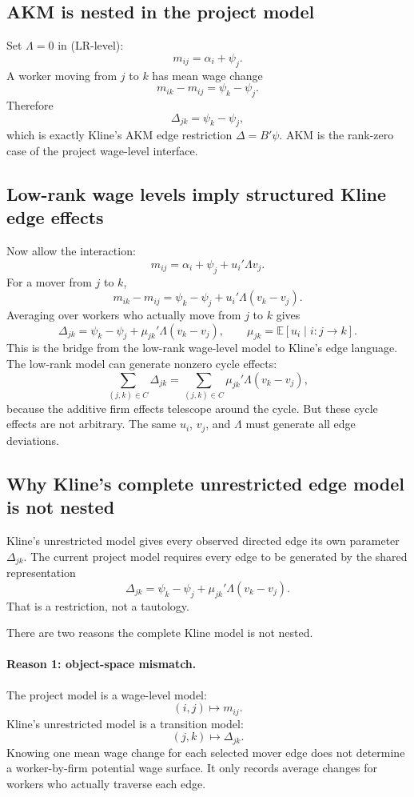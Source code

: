 \documentclass[11pt]{article}
\newcommand{\E}{\mathbb{E}}
\begin{document}
\subsection{AKM is nested in the project model}

Set \(\Lambda=0\) in (LR-level):
\[
m_{ij}=\alpha_i+\psi_j.
\]
A worker moving from \(j\) to \(k\) has mean wage change
\[
m_{ik}-m_{ij}
=
\psi_k-\psi_j.
\]
Therefore
\[
\Delta_{jk}=\psi_k-\psi_j,
\]
which is exactly Kline's AKM edge restriction \(\Delta=B'\psi\). AKM is the
rank-zero case of the project wage-level interface.

\subsection{Low-rank wage levels imply structured Kline edge effects}

Now allow the interaction:
\[
m_{ij}
=
\alpha_i+\psi_j+u_i'\Lambda v_j.
\]
For a mover from \(j\) to \(k\),
\[
m_{ik}-m_{ij}
=
\psi_k-\psi_j+u_i'\Lambda(v_k-v_j).
\]
Averaging over workers who actually move from \(j\) to \(k\) gives
\[
\Delta_{jk}
=
\psi_k-\psi_j+\mu_{jk}'\Lambda(v_k-v_j),
\qquad
\mu_{jk}=\E[u_i\mid i:j\to k].
\tag{LR-implied-edge}
\]
This is the bridge from the low-rank wage-level model to Kline's edge language.
The low-rank model can generate nonzero cycle effects:
\[
\sum_{(j,k)\in C}\Delta_{jk}
=
\sum_{(j,k)\in C}\mu_{jk}'\Lambda(v_k-v_j),
\tag{LR-cycle}
\]
because the additive firm effects telescope around the cycle. But these cycle
effects are not arbitrary. The same \(u_i\), \(v_j\), and \(\Lambda\) must
generate all edge deviations.

\subsection{Why Kline's complete unrestricted edge model is not nested}

Kline's unrestricted model gives every observed directed edge its own parameter
\(\Delta_{jk}\). The current project model requires every edge to be generated
by the shared representation
\[
\Delta_{jk}
=
\psi_k-\psi_j+\mu_{jk}'\Lambda(v_k-v_j).
\]
That is a restriction, not a tautology.

There are two reasons the complete Kline model is not nested.

\paragraph{Reason 1: object-space mismatch.}
The project model is a wage-level model:
\[
(i,j)\mapsto m_{ij}.
\]
Kline's unrestricted model is a transition model:
\[
(j,k)\mapsto \Delta_{jk}.
\]
Knowing one mean wage change for each selected mover edge does not determine a
worker-by-firm potential wage surface. It only records average changes for
workers who actually traverse each edge.
\end{document}
